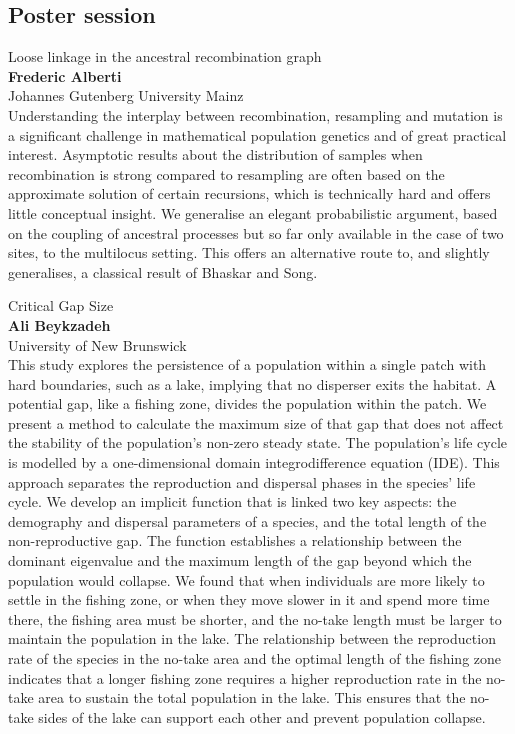 \documentclass[12pt,a4paper]{article}
\begin{document}
\subsection*{\sffamily Poster session}
\label{ss:poster}
\noindent
{\Large Loose linkage in the ancestral recombination graph}\\[1ex]
{\large 
\textbf{Frederic Alberti}\\[1ex] Johannes Gutenberg University Mainz}\\[2ex]
Understanding the interplay between recombination, resampling and mutation is a significant challenge in mathematical population genetics and of great practical interest. Asymptotic results about the distribution of samples when recombination is strong compared to resampling are often based on the approximate solution of certain recursions, which is technically hard and offers little conceptual insight. We generalise an elegant probabilistic argument, based on the coupling of ancestral processes but so far only available in the case of two sites, to the multilocus setting. This offers an alternative route to, and slightly generalises, a classical result of Bhaskar and Song. 

\bigskip \bigskip  %

\noindent
{\Large Critical Gap Size}\\[1ex]
{\large 
\textbf{Ali Beykzadeh}\\[1ex] University of New Brunswick }\\[2ex]
This study explores the persistence of a population within a single patch with hard boundaries, such as a lake, implying that no disperser exits the habitat. A potential gap, like a fishing zone, divides the population within the patch. We present a method to calculate the maximum size of that gap that does not affect the stability of the population’s non-zero steady state. The population’s life cycle is modelled by a one-dimensional domain integrodifference equation (IDE). This approach separates the reproduction and dispersal phases in the species’ life cycle. We develop an implicit function that is linked two key aspects: the demography and dispersal parameters of a species, and the total length of the non-reproductive gap. The function establishes a relationship between the dominant eigenvalue and the maximum length of the gap beyond which the population would collapse. We found that when individuals are more likely to settle in the fishing zone, or when they move slower in it and spend more time there, the fishing area must be shorter, and the no-take length must be larger to maintain the population in the lake. The relationship between the reproduction rate of the species in the no-take area and the optimal length of the fishing zone indicates that a longer fishing zone requires a higher reproduction rate in the no-take area to sustain the total population in the lake. This ensures that the no-take sides of the lake can support each other and prevent population collapse.
\end{document}
